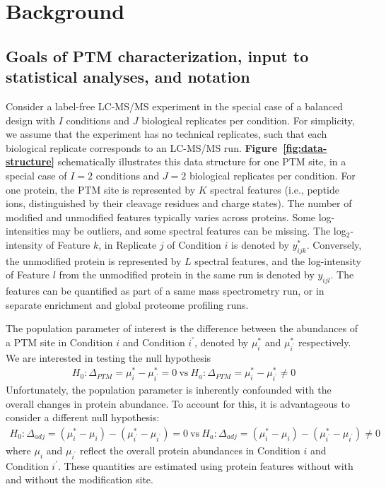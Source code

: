 \documentclass[mcp]{article}
\numberwithin{table}{section}
\def\figref#1{{\bf Figure~\ref{fig:#1}}}
\begin{document}
\section*{Background}

\subsection*{Goals of PTM characterization, input to statistical analyses, and notation}

Consider a label-free LC-MS/MS experiment in the special case of a balanced design with $I$ conditions and $J$ biological replicates per condition. For simplicity, we assume that the experiment has no technical replicates, such that each biological replicate corresponds to an LC-MS/MS run.  
\figref{data-structure} schematically illustrates this data structure for one PTM site, in a special case of $I=2$ conditions and $J=2$ biological replicates per condition.
For one protein, the PTM site is represented by $K$ spectral features (i.e., peptide ions, distinguished by their cleavage residues and charge states). 
The number of modified and unmodified features typically varies across proteins. Some log-intensities may be outliers, and some spectral features can be missing. 
The log$_2$-intensity of Feature $k$, in Replicate $j$ of Condition $i$ is denoted by $y_{ijk}^{\ast}$. Conversely, the unmodified protein is represented by $L$ spectral features, and the log-intensity of Feature $l$ from the unmodified protein in the same run is denoted by $y_{ijl}$. The features can be quantified as part of a same mass spectrometry run, or in separate enrichment and global proteome profiling runs.

The population parameter of interest is the difference between the abundances of a PTM site in Condition $i$ and Condition $i^{\prime}$, denoted by $\mu_i^{\ast}$ and $\mu_{i^{\prime}}^{\ast}$ respectively. We are interested in testing the null hypothesis
\begin{eqnarray}
H_{0}: \Delta_{PTM} = \mu_{i}^{\ast} - \mu_{i^{\prime}}^{\ast} = 0 \ \text{vs} \ 
H_{a}: \Delta_{PTM} = \mu_{i}^{\ast} - \mu_{i^{\prime}}^{\ast} \neq 0
\label{eq:conv_null_hyp}
\end{eqnarray}
Unfortunately, the population parameter is inherently confounded with the overall changes in protein abundance. To account for this, it is advantageous to consider a different null hypothesis:
\begin{eqnarray}
H_{0}: \Delta_{adj} = ( \mu_{i}^{\ast} - \mu_{i}) - ( \mu_{i^{\prime}}^{\ast} - \mu_{i^{\prime}} ) = 0 \ \text{vs} \ 
H_{a}: \Delta_{adj} = ( \mu_{i}^{\ast} - \mu_{i}) - ( \mu_{i^{\prime}}^{\ast} - \mu_{i^{\prime}} ) \neq 0
\label{eq:null_hyp}
\end{eqnarray}
where $\mu_i$ and $\mu_{i^{\prime}}$ reflect the overall protein abundances in Condition $i$ and Condition $i^{\prime}$. These quantities are estimated using protein features without with and without the modification site.
\end{document}
